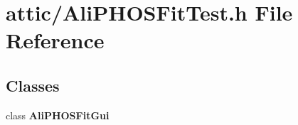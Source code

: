 \section{attic/Ali\-PHOSFit\-Test.h File Reference}
\label{AliPHOSFitTest_8h}
\subsection*{Classes}
\begin{CompactItemize}
\item 
class {\bf Ali\-PHOSFit\-Gui}
\end{CompactItemize}
